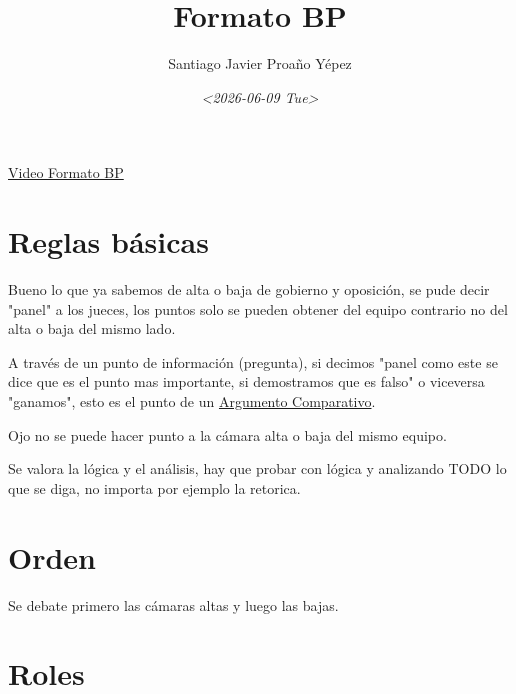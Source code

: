\documentclass[11pt]{article}
\author{Santiago Javier Proaño Yépez}
\date{\textit{<2026-06-09 Tue>}}
\title{Formato BP}
\begin{document}
\maketitle
\tableofcontents

\href{https://youtu.be/W6YJWXjc2-0?si=jG-pbFB4\_5yKhSLc}{Video Formato BP}

\section{Reglas básicas}
\label{sec:orge031bfa}
Bueno lo que ya sabemos de alta o baja de gobierno y oposición, se
pude decir "panel" a los jueces, los puntos solo se pueden obtener del
equipo contrario no del alta o baja del mismo lado.

A través de un
punto de información (pregunta), si decimos "panel
como este se dice que es el punto mas importante, si demostramos que es
falso" o viceversa "ganamos", esto es el punto de un \href{Argumentacón_Debate_Competitivo.org}{Argumento
Comparativo}.

Ojo no se puede hacer punto a la cámara alta o baja del mismo equipo. 

Se valora la lógica y el análisis, hay que probar con lógica y
analizando TODO lo
que se diga, no importa por ejemplo la retorica.


\section{Orden}
\label{sec:org4c651c9}
Se debate primero las cámaras altas y luego las bajas. 

\section{Roles}
\label{sec:orgccc1248}
\end{document}
